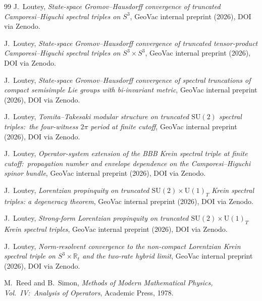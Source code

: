 \documentclass[11pt,a4paper]{article}
\theoremstyle{plain}
\theoremstyle{definition}
\newcommand{\sthree}{S^{3}}
\newcommand{\R}{\mathbb{R}}
\newcommand{\SU}{\mathrm{SU}}
\newcommand{\Uone}{\mathrm{U}(1)}
\begin{document}
\begin{thebibliography}{99}
J.~Loutey,
\newblock \emph{State-space Gromov--Hausdorff convergence of truncated
Camporesi--Higuchi spectral triples on $\sthree$},
\newblock GeoVac internal preprint (2026), DOI via Zenodo.

J.~Loutey,
\newblock \emph{State-space Gromov--Hausdorff convergence of truncated
tensor-product Camporesi--Higuchi spectral triples on $\sthree \times \sthree$},
\newblock GeoVac internal preprint (2026), DOI via Zenodo.

J.~Loutey,
\newblock \emph{State-space Gromov--Hausdorff convergence of spectral
truncations of compact semisimple Lie groups with bi-invariant metric},
\newblock GeoVac internal preprint (2026), DOI via Zenodo.

J.~Loutey,
\newblock \emph{Tomita--Takesaki modular structure on truncated
$\SU(2)$ spectral triples:\ the four-witness $2\pi$ period at finite
cutoff},
\newblock GeoVac internal preprint (2026), DOI via Zenodo.

J.~Loutey,
\newblock \emph{Operator-system extension of the BBB Krein spectral
triple at finite cutoff:\ propagation number and envelope dependence
on the Camporesi--Higuchi spinor bundle},
\newblock GeoVac internal preprint (2026), DOI via Zenodo.

J.~Loutey,
\newblock \emph{Lorentzian propinquity on truncated $\SU(2) \times \Uone_{T}$ Krein spectral triples: a degeneracy theorem},
\newblock GeoVac internal preprint (2026), DOI via Zenodo.

J.~Loutey,
\newblock \emph{Strong-form Lorentzian propinquity on truncated $\SU(2) \times \Uone_{T}$ Krein spectral triples},
\newblock GeoVac internal preprint (2026), DOI via Zenodo.

J.~Loutey,
\newblock \emph{Norm-resolvent convergence to the non-compact
Lorentzian Krein spectral triple on $\sthree \times \R_{t}$ and the
two-rate hybrid limit},
\newblock GeoVac internal preprint (2026), DOI via Zenodo.

M.~Reed and B.~Simon,
\newblock \emph{Methods of Modern Mathematical Physics, Vol.~IV:\
Analysis of Operators},
\newblock Academic Press, 1978.


\end{thebibliography}
\end{document}
